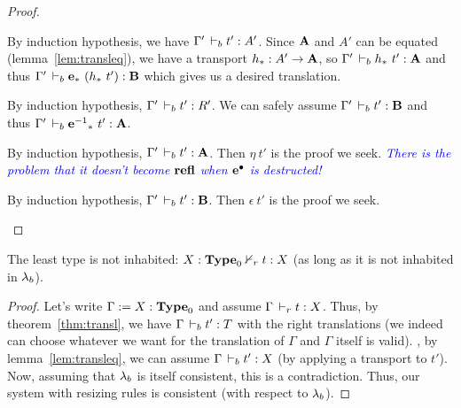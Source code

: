 \documentclass[a4paper,english]{lipics-utf8x}
\newcommand\meta[1]{\noindent\textcolor{blue}{\emph{#1}}}
\begin{document}
\begin{proof}
\begin{caselist}
      \nextcase
      \begin{mathc}
      \end{mathc}
      By induction hypothesis, we have $\Gamma' \,\vdash_b t' : A'$.
      Since $\operatorname{\mathbf{A}}$ and $A'$ can be equated (lemma~\ref{lem:transleq}),
      we have a transport $h_* : A' \to \operatorname{\mathbf{A}}$, so
      $\Gamma' \,\vdash_b h_*\ t' : \operatorname{\mathbf{A}}$ and thus
      $\Gamma' \,\vdash_b \operatorname{\mathbf{e}}_*\ (h_*\ t') : \operatorname{\mathbf{B}}$ which gives us a desired
      translation.

      \nextcase
      \begin{mathc}
      \end{mathc}
      By induction hypothesis, $\Gamma' \,\vdash_b t' : R'$.
      We can safely assume $\Gamma' \,\vdash_b t' : \operatorname{\mathbf{B}}$ and thus
      $\Gamma' \,\vdash_b {\operatorname{\mathbf{e}}^{-1}}_*\ t' : \operatorname{\mathbf{A}}$.

      \nextcase
      \begin{mathc}
      \end{mathc}
      By induction hypothesis, $\Gamma' \,\vdash_b t' : \operatorname{\mathbf{A}}$.
      Then $\eta\ t'$ is the proof we seek.
      \meta{There is the problem that it doesn't become $\operatorname{\mathbf{refl}}$ when $\operatorname{\operatorname{\mathbf{e}}^\bullet}$
      is destructed!}

      \nextcase
      \begin{mathc}
      \end{mathc}
      By induction hypothesis, $\Gamma' \,\vdash_b t' : \operatorname{\mathbf{B}}$.
      Then $\epsilon\ t'$ is the proof we seek.
    \end{caselist}
  \end{proof}

  \begin{corollary}
    \label{cor:cons1}
    The least type is not inhabited: $X : \operatorname{\mathbf{Type}}_0 \nvdash_r t : X$
    (as long as it is not inhabited in $\lambda_b$).
  \end{corollary}

  \begin{proof}
    Let's write $\Gamma := X : \operatorname{\mathbf{Type}}_0$ and assume $\Gamma \,\vdash_r t : X$.
    Thus, by theorem~\ref{thm:transl}, we have $\Gamma \,\vdash_b t' : T$ with
    the right translations (we indeed can choose whatever we want for the
    translation of $\Gamma$ and $\Gamma$ itself is valid).
    \Wlog, by lemma~\ref{lem:transleq}, we can assume
    $\Gamma \,\vdash_b t' : X$ (by applying a transport to $t'$).
    Now, assuming that $\lambda_b$ is itself consistent, this is a contradiction.
    Thus, our system with resizing rules is consistent (with respect to $\lambda_b$).
  \end{proof}
\end{document}
